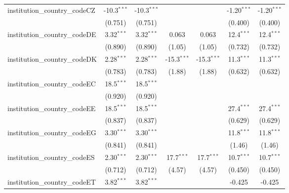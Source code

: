 \begin{tabular}{lcccccc}
   institution\_country\_codeCZ          & -10.3$^{***}$  & -10.3$^{***}$  &               &               & -1.20$^{***}$ & -1.20$^{***}$\\   
                                         & (0.751)        & (0.751)        &               &               & (0.400)       & (0.400)\\   
   institution\_country\_codeDE          & 3.32$^{***}$   & 3.32$^{***}$   & 0.063         & 0.063         & 12.4$^{***}$  & 12.4$^{***}$\\   
                                         & (0.890)        & (0.890)        & (1.05)        & (1.05)        & (0.732)       & (0.732)\\   
   institution\_country\_codeDK          & 2.28$^{***}$   & 2.28$^{***}$   & -15.3$^{***}$ & -15.3$^{***}$ & 11.3$^{***}$  & 11.3$^{***}$\\   
                                         & (0.783)        & (0.783)        & (1.88)        & (1.88)        & (0.632)       & (0.632)\\   
   institution\_country\_codeEC          & 18.5$^{***}$   & 18.5$^{***}$   &               &               &               &   \\   
                                         & (0.920)        & (0.920)        &               &               &               &   \\   
   institution\_country\_codeEE          & 18.5$^{***}$   & 18.5$^{***}$   &               &               & 27.4$^{***}$  & 27.4$^{***}$\\   
                                         & (0.837)        & (0.837)        &               &               & (0.629)       & (0.629)\\   
   institution\_country\_codeEG          & 3.30$^{***}$   & 3.30$^{***}$   &               &               & 11.8$^{***}$  & 11.8$^{***}$\\   
                                         & (0.841)        & (0.841)        &               &               & (1.46)        & (1.46)\\   
   institution\_country\_codeES          & 2.30$^{***}$   & 2.30$^{***}$   & 17.7$^{***}$  & 17.7$^{***}$  & 10.7$^{***}$  & 10.7$^{***}$\\   
                                         & (0.712)        & (0.712)        & (4.57)        & (4.57)        & (0.450)       & (0.450)\\   
   institution\_country\_codeET          & 3.82$^{***}$   & 3.82$^{***}$   &               &               & -0.425        & -0.425\\   

\end{tabular}
